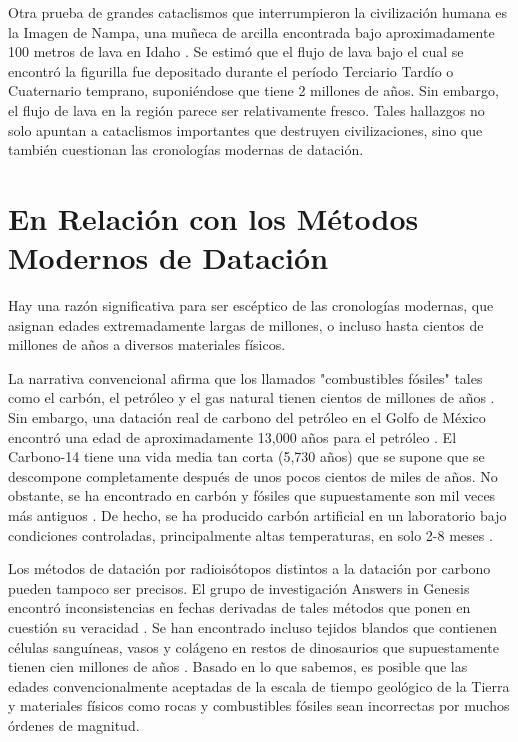 \documentclass[10pt,twocolumn,letterpaper]{article}
\begin{document}
Otra prueba de grandes cataclismos que interrumpieron la civilización humana es la Imagen de Nampa, una muñeca de arcilla encontrada bajo aproximadamente 100 metros de lava en Idaho \cite{102,103}. Se estimó que el flujo de lava bajo el cual se encontró la figurilla fue depositado durante el período Terciario Tardío o Cuaternario temprano, suponiéndose que tiene 2 millones de años. Sin embargo, el flujo de lava en la región parece ser relativamente fresco. Tales hallazgos no solo apuntan a cataclismos importantes que destruyen civilizaciones, sino que también cuestionan las cronologías modernas de datación.

\section{En Relación con los Métodos Modernos de Datación}
Hay una razón significativa para ser escéptico de las cronologías modernas, que asignan edades extremadamente largas de millones, o incluso hasta cientos de millones de años a diversos materiales físicos.

La narrativa convencional afirma que los llamados "combustibles fósiles" tales como el carbón, el petróleo y el gas natural tienen cientos de millones de años \cite{104}. Sin embargo, una datación real de carbono del petróleo en el Golfo de México encontró una edad de aproximadamente 13,000 años para el petróleo \cite{105}. El Carbono-14 tiene una vida media tan corta (5,730 años) que se supone que se descompone completamente después de unos pocos cientos de miles de años. No obstante, se ha encontrado en carbón y fósiles que supuestamente son mil veces más antiguos \cite{106}. De hecho, se ha producido carbón artificial en un laboratorio bajo condiciones controladas, principalmente altas temperaturas, en solo 2-8 meses \cite{107}.

Los métodos de datación por radioisótopos distintos a la datación por carbono pueden tampoco ser precisos. El grupo de investigación Answers in Genesis encontró inconsistencias en fechas derivadas de tales métodos que ponen en cuestión su veracidad \cite{108}. Se han encontrado incluso tejidos blandos que contienen células sanguíneas, vasos y colágeno en restos de dinosaurios que supuestamente tienen cien millones de años \cite{109,110}. Basado en lo que sabemos, es posible que las edades convencionalmente aceptadas de la escala de tiempo geológico de la Tierra y materiales físicos como rocas y combustibles fósiles sean incorrectas por muchos órdenes de magnitud.
\end{document}
